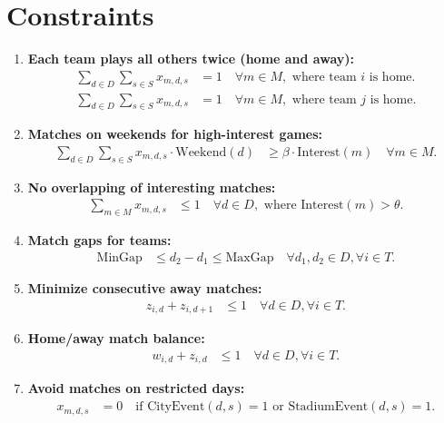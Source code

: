 \documentclass[a4paper, 12pt]{article}
\begin{document}
\section*{Constraints}
\begin{enumerate}
    \item \textbf{Each team plays all others twice (home and away):}
    \begin{align*}
        \sum_{d \in D} \sum_{s \in S} x_{m,d,s} &= 1 \quad \forall m \in M, \text{ where team } i \text{ is home.} \\
        \sum_{d \in D} \sum_{s \in S} x_{m,d,s} &= 1 \quad \forall m \in M, \text{ where team } j \text{ is home.}
    \end{align*}

    \item \textbf{Matches on weekends for high-interest games:}
    \begin{align*}
        \sum_{d \in D} \sum_{s \in S} x_{m,d,s} \cdot \text{Weekend}(d) &\geq \beta \cdot \text{Interest}(m) \quad \forall m \in M.
    \end{align*}

    \item \textbf{No overlapping of interesting matches:}
    \begin{align*}
        \sum_{m \in M} x_{m,d,s} &\leq 1 \quad \forall d \in D, \text{ where } \text{Interest}(m) > \theta.
    \end{align*}

    \item \textbf{Match gaps for teams:}
    \begin{align*}
        \text{MinGap} &\leq d_2 - d_1 \leq \text{MaxGap} \quad \forall d_1, d_2 \in D, \forall i \in T.
    \end{align*}

    \item \textbf{Minimize consecutive away matches:}
    \begin{align*}
        z_{i,d} + z_{i,d+1} &\leq 1 \quad \forall d \in D, \forall i \in T.
    \end{align*}

    \item \textbf{Home/away match balance:}
    \begin{align*}
        w_{i,d} + z_{i,d} &\leq 1 \quad \forall d \in D, \forall i \in T.
    \end{align*}

    \item \textbf{Avoid matches on restricted days:}
    \begin{align*}
        x_{m,d,s} &= 0 \quad \text{if } \text{CityEvent}(d,s) = 1 \text{ or } \text{StadiumEvent}(d,s) = 1.
    \end{align*}


\end{enumerate}
\end{document}
